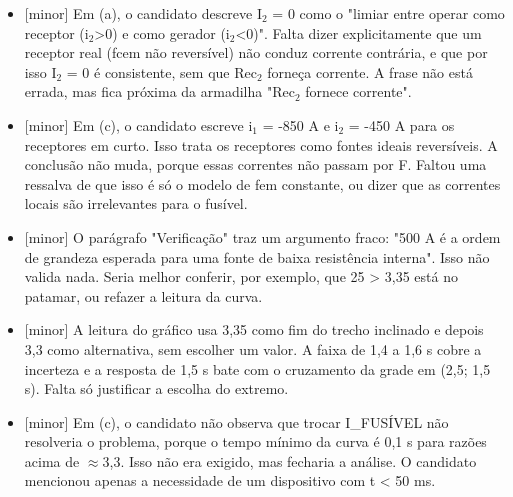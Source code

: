 \documentclass{article}%
\begin{document}
\begin{itemize}%
\item%
{[}minor{]} Em (a), o candidato descreve I$_{2}$ = 0 como o "limiar entre operar como receptor (i$_{2}$>0) e como gerador (i$_{2}$<0)". Falta dizer explicitamente que um receptor real (fcem não reversível) não conduz corrente contrária, e que por isso I$_{2}$ = 0 é consistente, sem que Rec$_{2}$ forneça corrente. A frase não está errada, mas fica próxima da armadilha "Rec$_{2}$ fornece corrente".%
\item%
{[}minor{]} Em (c), o candidato escreve i$_{1}$ = -850 A e i$_{2}$ = -450 A para os receptores em curto. Isso trata os receptores como fontes ideais reversíveis. A conclusão não muda, porque essas correntes não passam por F. Faltou uma ressalva de que isso é só o modelo de fem constante, ou dizer que as correntes locais são irrelevantes para o fusível.%
\item%
{[}minor{]} O parágrafo "Verificação" traz um argumento fraco: "500 A é a ordem de grandeza esperada para uma fonte de baixa resistência interna". Isso não valida nada. Seria melhor conferir, por exemplo, que 25 > 3,35 está no patamar, ou refazer a leitura da curva.%
\item%
{[}minor{]} A leitura do gráfico usa 3,35 como fim do trecho inclinado e depois 3,3 como alternativa, sem escolher um valor. A faixa de 1,4 a 1,6 s cobre a incerteza e a resposta de 1,5 s bate com o cruzamento da grade em (2,5; 1,5 s). Falta só justificar a escolha do extremo.%
\item%
{[}minor{]} Em (c), o candidato não observa que trocar I\_FUSÍVEL não resolveria o problema, porque o tempo mínimo da curva é 0,1 s para razões acima de $\approx$3,3. Isso não era exigido, mas fecharia a análise. O candidato mencionou apenas a necessidade de um dispositivo com t < 50 ms.%
\end{itemize}%
\end{document}

